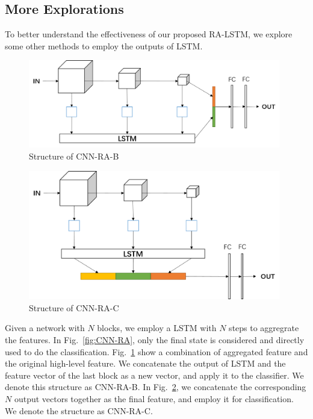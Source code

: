 \documentclass[runningheads]{llncs}
\begin{document}
\subsection{More Explorations}
To better understand the effectiveness of our proposed RA-LSTM, we explore some other methods to employ the outputs of LSTM.
\begin{figure}   
	\centering
	\includegraphics[width=11cm]{Figures/RA-B.png}
	\caption{Structure of CNN-RA-B}
	\label{fig:CNN-RA-B}
\end{figure}
\begin{figure}  
	\centering
	\includegraphics[width=11cm]{Figures/RA-C.png}
	\caption{Structure of CNN-RA-C}
	\label{fig:CNN-RA-C}
\end{figure}

Given a network with $N$ blocks, we employ a LSTM with $N$ steps to aggregrate the features. In Fig.~\ref{fig:CNN-RA}, only the final state is considered and directly used to do the classification. Fig.~\ref{fig:CNN-RA-B} show a combination of aggregated feature and the original high-level feature. We concatenate the output of LSTM and the feature vector of the last block as a new vector, and apply it to the classifier. We denote this structure as CNN-RA-B. In Fig.~\ref{fig:CNN-RA-C}, we concatenate the corresponding $N$ output vectors together as the final feature, and employ it for classification. We denote the structure as CNN-RA-C.
\end{document}
